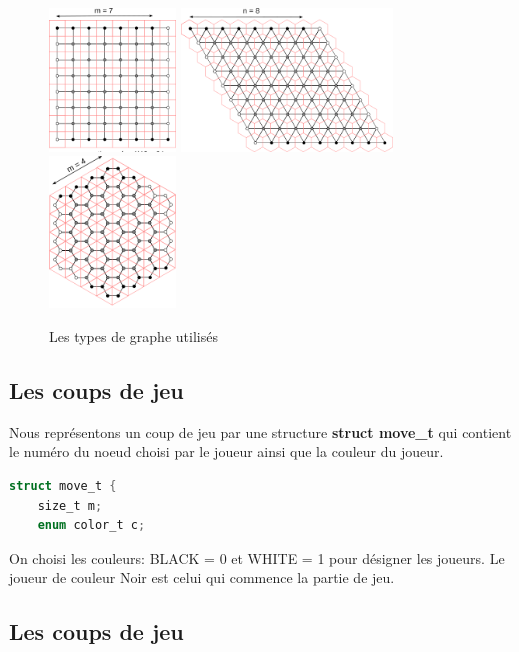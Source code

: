 \begin{figure}[h]
    \centering
    \label{fig:Hexgraph}
    \includegraphics[width=0.3\textwidth]{Images/carre.png}
    \includegraphics[width=0.5\textwidth]{Images/hexagonal.png}
    \includegraphics[width=0.3\textwidth]{Images/triangulaire.png}
    \caption{Les types de graphe utilisés}
\end{figure}

\subsection{Les coups de jeu}

Nous représentons un coup de jeu par une structure \textbf{struct move\_t} qui contient le numéro du noeud choisi par le joueur ainsi que la couleur du joueur. 
\begin{lstlisting}[language={C},captionpos=b, frame=single]
    struct move_t {
    size_t m; 
    enum color_t c;
\end{lstlisting}

On choisi les couleurs: BLACK = 0 et WHITE = 1 pour désigner les joueurs. Le joueur de couleur Noir est celui qui commence la partie de jeu.  

\subsection{Les coups de jeu}
